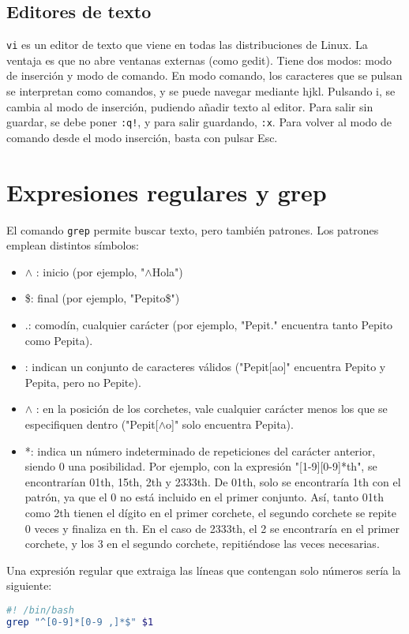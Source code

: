 \subsection{Editores de texto}
\texttt{vi} es un editor de texto que viene en todas las distribuciones de Linux. La ventaja es que no abre ventanas externas (como gedit). Tiene dos modos: modo de inserción y modo de comando. En modo comando, los caracteres que se pulsan se interpretan como comandos, y se puede navegar mediante hjkl. Pulsando i, se cambia al modo de inserción, pudiendo añadir texto al editor. Para salir sin guardar, se debe poner \texttt{:q!}, y para salir guardando, \texttt{:x}. Para volver al modo de comando desde el modo inserción, basta con pulsar Esc. 

\section{Expresiones regulares y grep}
El comando \texttt{grep} permite buscar texto, pero también patrones. Los patrones emplean distintos símbolos:
\begin{itemize}
\item $\wedge$ : inicio (por ejemplo, "$\wedge$Hola")
\item \$: final (por ejemplo, "Pepito\$")
\item .: comodín, cualquier carácter (por ejemplo, "Pepit." encuentra tanto Pepito como Pepita).
\item \lbrack \rbrack: indican un conjunto de caracteres válidos ("Pepit[ao]" encuentra Pepito y Pepita, pero no Pepite).
\item \lbrack  $\wedge$ \rbrack : en la posición de los corchetes, vale cualquier carácter menos los que se especifiquen dentro ("Pepit[$\wedge$o]" solo encuentra Pepita).
\item *: indica un número indeterminado de repeticiones del carácter anterior, siendo 0 una posibilidad. Por ejemplo, con la expresión "[1-9][0-9]*th", se encontrarían 01th, 15th, 2th y 2333th. De 01th, solo se encontraría 1th con el patrón, ya que el 0 no está incluido en el primer conjunto. Así, tanto 01th como 2th tienen el dígito en el primer corchete, el segundo corchete se repite 0 veces y finaliza en th. En el caso de 2333th, el 2 se encontraría en el primer corchete, y los 3 en el segundo corchete, repitiéndose las veces necesarias. 
\end{itemize} 

Una expresión regular que extraiga las líneas que contengan solo números sería la siguiente:
\begin{lstlisting}[language=bash]
#! /bin/bash
grep "^[0-9]*[0-9 ,]*$" $1
\end{lstlisting}